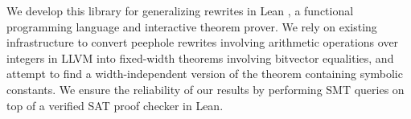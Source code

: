 \documentclass[review, anonymous, acmsmall]{acmart}
\begin{document}

We develop this library for generalizing rewrites in Lean \cite{moura_lean_2021},
a functional programming language and interactive theorem prover.
We rely on existing infrastructure \cite{bhat_verifying_2024} to convert peephole rewrites involving arithmetic operations over integers in LLVM into fixed-width theorems involving bitvector equalities,
and attempt to find a width-independent version of the theorem containing symbolic constants.
We ensure the reliability of our results by performing SMT queries on top of a verified SAT proof checker in Lean.
\end{document}

